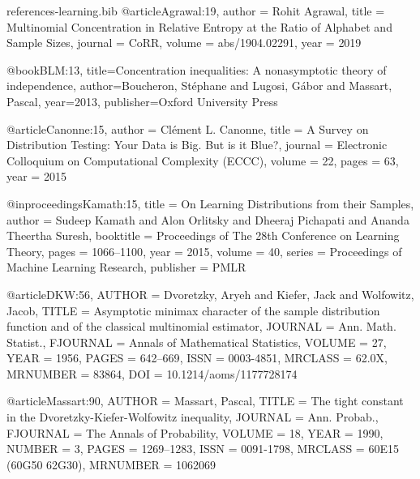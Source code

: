 \documentclass[10pt]{article}
\begin{document}
\begin{filecontents}{references-learning.bib}
@article{Agrawal:19,
  author    = {Rohit Agrawal},
  title     = {Multinomial Concentration in Relative Entropy at the Ratio of Alphabet and Sample Sizes},
  journal   = {CoRR},
  volume    = {abs/1904.02291},
  year      = {2019}
}

@book{BLM:13,
  title={Concentration inequalities: A nonasymptotic theory of independence},
  author={Boucheron, St{\'e}phane and Lugosi, G{\'a}bor and Massart, Pascal},
  year={2013},
  publisher={Oxford University Press}
}


@article{Canonne:15,
  author    = {Cl{\'{e}}ment L. Canonne},
  title     = {{A Survey on Distribution Testing: Your Data is Big. But is it Blue?}},
  journal   = {Electronic Colloquium on Computational Complexity {(ECCC)}},
  volume    = {22},
  pages     = {63},
  year      = {2015}
}



@inproceedings{Kamath:15,
  title = 	 {On Learning Distributions from their Samples},
  author = 	 {Sudeep Kamath and Alon Orlitsky and Dheeraj Pichapati and Ananda Theertha Suresh},
  booktitle = 	 {Proceedings of The 28th Conference on Learning Theory},
  pages = 	 {1066--1100},
  year = 	 {2015},
  volume = 	 {40},
  series = 	 {Proceedings of Machine Learning Research},
  publisher = 	 {PMLR}
}

@article{DKW:56,
    AUTHOR = {Dvoretzky, Aryeh and Kiefer, Jack and Wolfowitz, Jacob},
     TITLE = {Asymptotic minimax character of the sample distribution
              function and of the classical multinomial estimator},
   JOURNAL = {Ann. Math. Statist.},
  FJOURNAL = {Annals of Mathematical Statistics},
    VOLUME = {27},
      YEAR = {1956},
     PAGES = {642--669},
      ISSN = {0003-4851},
   MRCLASS = {62.0X},
  MRNUMBER = {83864},
       DOI = {10.1214/aoms/1177728174}
}

@article{Massart:90,
    AUTHOR = {Massart, Pascal},
     TITLE = {The tight constant in the {D}voretzky-{K}iefer-{W}olfowitz
              inequality},
   JOURNAL = {Ann. Probab.},
  FJOURNAL = {The Annals of Probability},
    VOLUME = {18},
      YEAR = {1990},
    NUMBER = {3},
     PAGES = {1269--1283},
      ISSN = {0091-1798},
   MRCLASS = {60E15 (60G50 62G30)},
  MRNUMBER = {1062069}
}

\end{filecontents}


\end{document}

